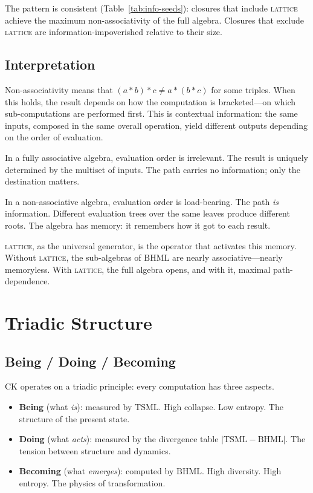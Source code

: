 \documentclass[11pt,a4paper]{article}
\theoremstyle{definition}
\theoremstyle{remark}
\newcommand{\TSML}{\mathrm{TSML}}
\newcommand{\BHML}{\mathrm{BHML}}
\begin{document}
The pattern is consistent (Table~\ref{tab:info-seeds}): closures that include \textsc{lattice} achieve the maximum non-associativity of the full algebra. Closures that exclude \textsc{lattice} are information-impoverished relative to their size.

\subsection{Interpretation}\label{sec:interpretation}

Non-associativity means that $(a\ast b)\ast c \neq a\ast (b\ast c)$ for some triples. When this holds, the result depends on how the computation is bracketed---on which sub-computations are performed first. This is contextual information: the same inputs, composed in the same overall operation, yield different outputs depending on the order of evaluation.

In a fully associative algebra, evaluation order is irrelevant. The result is uniquely determined by the multiset of inputs. The path carries no information; only the destination matters.

In a non-associative algebra, evaluation order is load-bearing. The path \emph{is} information. Different evaluation trees over the same leaves produce different roots. The algebra has memory: it remembers how it got to each result.

\textsc{lattice}, as the universal generator, is the operator that activates this memory. Without \textsc{lattice}, the sub-algebras of $\BHML$ are nearly associative---nearly memoryless. With \textsc{lattice}, the full algebra opens, and with it, maximal path-dependence.

\section{Triadic Structure}\label{sec:triadic}

\subsection{Being / Doing / Becoming}\label{sec:bdb}

CK operates on a triadic principle: every computation has three aspects.
\begin{itemize}
\item \textbf{Being} (what \emph{is}): measured by $\TSML$. High collapse. Low entropy. The structure of the present state.
\item \textbf{Doing} (what \emph{acts}): measured by the divergence table $|\TSML-\BHML|$. The tension between structure and dynamics.
\item \textbf{Becoming} (what \emph{emerges}): computed by $\BHML$. High diversity. High entropy. The physics of transformation.
\end{itemize}
\end{document}
